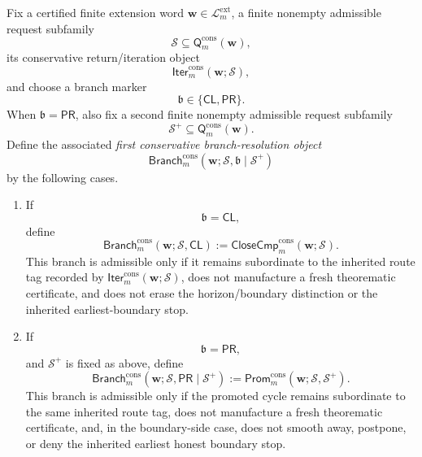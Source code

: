\begin{definition}
\label{def:first-conservative-branch-resolution-rule}
Fix a certified finite extension word \(\mathbf w\in\mathcal L^{\mathrm{ext}}_{m}\), a finite nonempty admissible request subfamily
\[
 \mathcal S \subseteq \mathsf{Q}^{\mathrm{cons}}_{m}(\mathbf w),
\]
its conservative return/iteration object
\[
 \mathsf{Iter}^{\mathrm{cons}}_{m}(\mathbf w;\mathcal S),
\]
and choose a branch marker
\[
 \mathfrak b\in\{\mathsf{CL},\mathsf{PR}\}.
\]
When \(\mathfrak b=\mathsf{PR}\), also fix a second finite nonempty admissible request subfamily
\[
 \mathcal S^{+}\subseteq \mathsf{Q}^{\mathrm{cons}}_{m}(\mathbf w).
\]
Define the associated \emph{first conservative branch-resolution object}
\[
 \mathsf{Branch}^{\mathrm{cons}}_{m}(\mathbf w;\mathcal S,\mathfrak b\mid\mathcal S^{+})
\]
by the following cases.
\begin{enumerate}[label=(\roman*)]
 \item If
\[
 \mathfrak b=\mathsf{CL},
\]
define
\[
 \mathsf{Branch}^{\mathrm{cons}}_{m}(\mathbf w;\mathcal S,\mathsf{CL})
 :=
 \mathsf{CloseCmp}^{\mathrm{cons}}_{m}(\mathbf w;\mathcal S).
\]
This branch is admissible only if it remains subordinate to the inherited route tag recorded by \(\mathsf{Iter}^{\mathrm{cons}}_{m}(\mathbf w;\mathcal S)\), does not manufacture a fresh theorematic certificate, and does not erase the horizon/boundary distinction or the inherited earliest-boundary stop.

 \item If
\[
 \mathfrak b=\mathsf{PR},
\]
and \(\mathcal S^{+}\) is fixed as above, define
\[
 \mathsf{Branch}^{\mathrm{cons}}_{m}(\mathbf w;\mathcal S,\mathsf{PR}\mid\mathcal S^{+})
 :=
 \mathsf{Prom}^{\mathrm{cons}}_{m}(\mathbf w;\mathcal S,\mathcal S^{+}).
\]
This branch is admissible only if the promoted cycle remains subordinate to the same inherited route tag, does not manufacture a fresh theorematic certificate, and, in the boundary-side case, does not smooth away, postpone, or deny the inherited earliest honest boundary stop.
\end{enumerate}
\end{definition}

